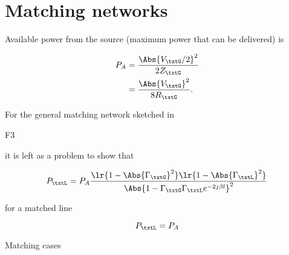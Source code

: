 %
%

\section{Matching networks}

Available power from the source (maximum power that can be delivered) is

\begin{equation}\label{eqn:uwavesDeck6LCmatchingCore:20}
\begin{aligned}
P_A
&= \frac{\Abs{V_\txtG/2}^2}{2 Z_\txtG}
\\ &= \frac{\Abs{V_\txtG}^2}{8 R_\txtG}.
\end{aligned}
\end{equation}

For the general matching network sketched in

F3

it is left as a problem to show that

\begin{equation}\label{eqn:uwavesDeck6LCmatchingCore:40}
P_\txtL = P_A \frac{
\lr{ 1 - \Abs{\Gamma_\txtG}^2 }
\lr{ 1 - \Abs{\Gamma_\txtL}^2 } }
{
\Abs{ 1 - \Gamma_\txtG \Gamma_\txtL e^{-2 j \beta l } }^2
}
\end{equation}

for a matched line

\begin{equation}\label{eqn:uwavesDeck6LCmatchingCore:60}
P_\txtL = P_A
\end{equation}

Matching cases

